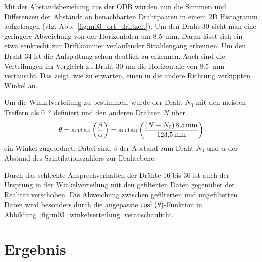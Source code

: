 \documentclass[11pt, ngerman, fleqn, DIV=15, headinclude, BCOR=2cm]{scrreprt}
\begin{document}
Mit der Abstandsbeziehung aus der ODB wurden nun die Summen und Differenzen der
Abstände an benachbarten Drahtpaaren in einem 2D Histogramm aufgetragen (vlg.
Abb.~\ref{fig:m03_ort_driftzeit}).
Um den Draht 30 sieht man eine geringere Abweichung von der Horizontalen um
\SI{8.5}{\milli\metre}. Daran lässt sich ein etwa senkrecht zur Driftkammer
verlaufender Strahlengang erkennen. Um den Draht 34 ist die Aufspaltung schon
deutlich zu erkennen. Auch sind die Verteilungen im Vergleich zu Draht 30 um
die Horizontale von \SI{8.5}{\milli\metre} vertauscht. Das zeigt, wie zu
erwarten, einen in die andere Richtung verkippten Winkel an.

Um die Winkelverteilung zu bestimmen, wurde der Draht $N_0$ mit den meisten Treffern
als \SI{0}{\degree} definiert und den anderen Drähten $N$ über
\begin{equation}
	\theta = \arctan{\del{\frac{\beta}{\alpha}}} = \arctan{\del{\frac{\del{N - N_0}
	\SI{8.5}{\milli\metre}}{\SI{123.5}{\milli\metre}}}}
\end{equation}
ein Winkel zugeordnet. Dabei sind $\beta$ der Abstand zum Draht $N_0$ und
$\alpha$ der Abstand des Szintilationszählers zur Drahtebene.

Durch das schlechte Ansprechverhalten der Drähte 16 bis 30 ist auch der
Ursprung in der Winkelverteilung mit den gefilterten Daten gegenüber der
Realität verschoben. Die Abweichung zwischen gefilterten und ungefilterten
Daten wird besonders durch die angepasste $\cos^2\del{\theta}$-Funktion in
Abbildung~\ref{fig:m03_winkelverteilung} veranschaulicht.



\chapter{Ergebnis}



\end{document}
